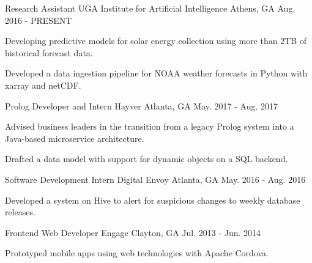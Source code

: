 \begin{cventries}

\cventry
{Research Assistant}
{UGA Institute for Artificial Intelligence}
{Athens, GA}
{Aug. 2016 - PRESENT}
{\begin{cvitems}
    \item {Developing predictive models for solar energy collection using more than 2TB of historical forecast data.}
    \item {Developed a data ingestion pipeline for NOAA weather forecasts in Python with xarray and netCDF.}
\end{cvitems}}

\cventry
{Prolog Developer and Intern}
{Hayver}
{Atlanta, GA}
{May. 2017 - Aug. 2017}
{\begin{cvitems}
    \item {Advised business leaders in the transition from a legacy Prolog system into a Java-based microservice architecture.}
    \item {Drafted a data model with support for dynamic objects on a SQL backend.}
\end{cvitems}}

\cventry
{Software Development Intern}
{Digital Envoy}
{Atlanta, GA}
{May. 2016 - Aug. 2016}
{\begin{cvitems}
    \item {Developed a system on Hive to alert for suspicious changes to weekly database releases.}
\end{cvitems}}

\cventry
{Frontend Web Developer}
{Engage}
{Clayton, GA}
{Jul. 2013 - Jun. 2014}
{{\begin{cvitems}
    \item {Prototyped mobile apps using web technologies with Apache Cordova.}
\end{cvitems}}}

\end{cventries}
